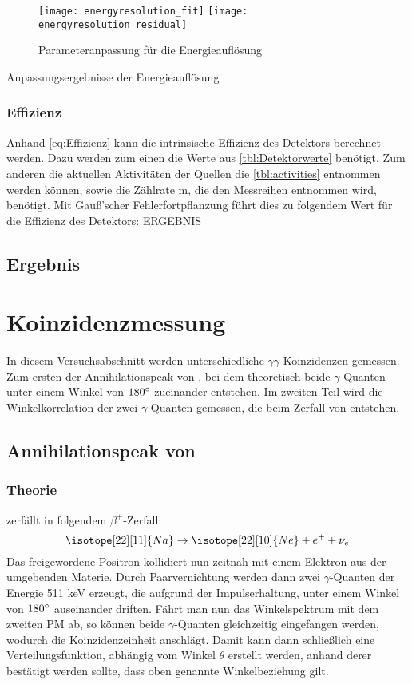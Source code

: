 \documentclass{../Misc/MontavonLaTeX/Montavon}
\newcommand{\halfwidth}{0.48\textwidth}
\begin{document}
\begin{figure}[htbp]
\texttt{[image: energyresolution\_fit]}
\texttt{[image: energyresolution\_residual]}
\caption{Parameteranpassung für die Energieauflösung}
\label{fig:Energieaufloesung}
\end{figure}


\begin{table}[htbp]
\centering
%
\caption{Anpassungsergebnisse der Energieauflösung}
\label{tbl:Energieauflösung}
\end{table}

\subsubsection{Effizienz}
Anhand \ref{eq:Effizienz} kann die intrinsische Effizienz des Detektors berechnet werden. Dazu werden zum einen die Werte aus \ref{tbl:Detektorwerte} benötigt. Zum anderen die aktuellen Aktivitäten der Quellen die
\ref{tbl:activities} entnommen werden können, sowie die Zählrate m, die den Messreihen entnommen wird, benötigt. Mit Gauß'scher Fehlerfortpflanzung führt dies zu folgendem Wert für die Effizienz des Detektors: 
ERGEBNIS
 
\subsection{Ergebnis}


\section{Koinzidenzmessung}
In diesem Versuchsabschnitt werden unterschiedliche $\gamma\gamma$-Koinzidenzen gemessen. Zum ersten der Annihilationspeak von , bei dem theoretisch beide $\gamma$-Quanten unter einem Winkel von $180 ^{\circ}$ zueinander entstehen. 
Im zweiten Teil wird die Winkelkorrelation der zwei $\gamma$-Quanten gemessen, die beim Zerfall von  entstehen. 
\subsection{Annihilationspeak von }
\subsubsection{Theorie}
 zerfällt in folgendem $\beta^{+}$-Zerfall:
\begin{equation}
\isotope[22][11]{Na} \rightarrow \isotope[22][10]{Ne} + e^{+} + \nu_{e}
\end{equation}
Das freigewordene Positron kollidiert nun zeitnah mit einem Elektron aus der umgebenden Materie. Durch Paarvernichtung werden dann zwei $\gamma$-Quanten der Energie 511 keV erzeugt, die aufgrund der Impulserhaltung, unter einem Winkel von $180 ^{\circ}$ auseinander driften. 
Fährt man nun das Winkelspektrum mit dem zweiten PM ab, so können beide $\gamma$-Quanten gleichzeitig eingefangen werden, wodurch die Koinzidenzeinheit anschlägt. Damit kann dann schließlich eine Verteilungsfunktion, abhängig vom Winkel $\theta$ erstellt werden, anhand derer 
bestätigt werden sollte, dass oben genannte Winkelbeziehung gilt.
\end{document}
